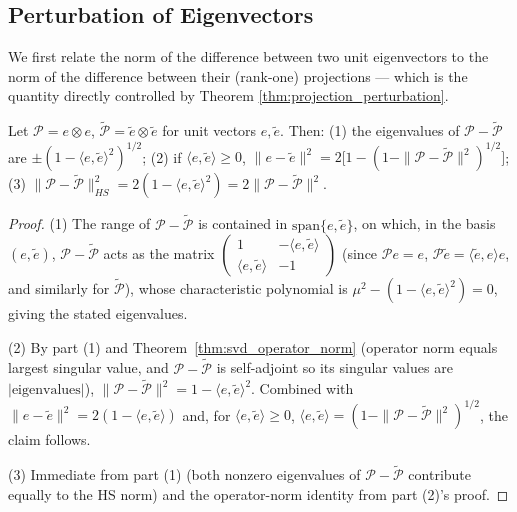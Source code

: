 \subsection{Perturbation of Eigenvectors}
\label{subsec:eigenvector_perturbation}

We first relate the norm of the difference between two unit eigenvectors
to the norm of the difference between their (rank-one) projections ---
which is the quantity directly controlled by Theorem
\ref{thm:projection_perturbation}.

\begin{lemma}
\label{lem:eigenvector_projection_norm}
Let $\mathcal{P}=e\otimes e$, $\widetilde{\mathcal{P}}=\widetilde{e}\otimes
\widetilde{e}$ for unit vectors $e,\widetilde{e}$. Then: (1) the
eigenvalues of $\mathcal{P}-\widetilde{\mathcal{P}}$ are $\pm(1-\langle
e,\widetilde{e}\rangle^2)^{1/2}$; (2) if $\langle e,\widetilde{e}\rangle
\geq 0$, $\|e-\widetilde{e}\|^2 = 2\big[1-(1-\|\mathcal{P}-
\widetilde{\mathcal{P}}\|^2)^{1/2}\big]$; (3) $\|\mathcal{P}-
\widetilde{\mathcal{P}}\|_{HS}^2 = 2(1-\langle e,\widetilde{e}\rangle^2)
= 2\|\mathcal{P}-\widetilde{\mathcal{P}}\|^2$.
\end{lemma}

\begin{proof}
(1) The range of $\mathcal{P}-\widetilde{\mathcal{P}}$ is contained in
$\mathrm{span}\{e,\widetilde{e}\}$, on which, in the basis $(e,
\widetilde{e})$, $\mathcal{P}-\widetilde{\mathcal{P}}$ acts as the matrix
$\left(\begin{smallmatrix}1&-\langle e,\widetilde{e}\rangle\\ \langle
e,\widetilde{e}\rangle&-1\end{smallmatrix}\right)$ (since $\mathcal{P}e=e$,
$\mathcal{P}\widetilde{e}=\langle\widetilde{e},e\rangle e$, and
similarly for $\widetilde{\mathcal{P}}$), whose characteristic polynomial
is $\mu^2-(1-\langle e,\widetilde{e}\rangle^2)=0$, giving the stated
eigenvalues.

(2) By part (1) and Theorem~\ref{thm:svd_operator_norm} (operator norm
equals largest singular value, and $\mathcal{P}-\widetilde{\mathcal{P}}$
is self-adjoint so its singular values are $|\text{eigenvalues}|$),
$\|\mathcal{P}-\widetilde{\mathcal{P}}\|^2 = 1-\langle e,\widetilde{e}
\rangle^2$. Combined with $\|e-\widetilde{e}\|^2 = 2(1-\langle e,
\widetilde{e}\rangle)$ and, for $\langle e,\widetilde{e}\rangle\geq 0$,
$\langle e,\widetilde{e}\rangle = (1-\|\mathcal{P}-\widetilde{\mathcal{P}}
\|^2)^{1/2}$, the claim follows.

(3) Immediate from part (1) (both nonzero eigenvalues of $\mathcal{P}-
\widetilde{\mathcal{P}}$ contribute equally to the HS norm) and the
operator-norm identity from part (2)'s proof.
\end{proof}

